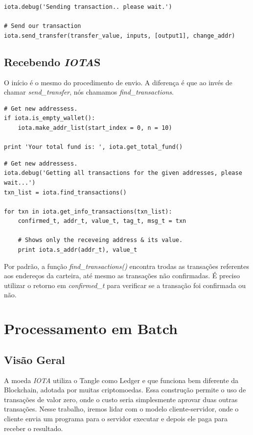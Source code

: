 \documentclass[a4paper]{article}
\begin{document}
\begin{lstlisting}
iota.debug('Sending transaction.. please wait.')

# Send our transaction
iota.send_transfer(transfer_value, inputs, [output1], change_addr)
\end{lstlisting}

\subsection{Recebendo \textit{IOTA}S}

O início é o mesmo do procedimento de envio. A diferença é que ao invés de chamar \textit{send\_transfer}, nós chamamos \textit{find\_transactions}.

\begin{lstlisting}
# Get new addressess.
if iota.is_empty_wallet():
    iota.make_addr_list(start_index = 0, n = 10)

print 'Your total fund is: ', iota.get_total_fund()
\end{lstlisting}


\begin{lstlisting}
# Get new addressess.
iota.debug('Getting all transactions for the given addresses, please wait...')
txn_list = iota.find_transactions()

for txn in iota.get_info_transactions(txn_list):
    confirmed_t, addr_t, value_t, tag_t, msg_t = txn

    # Shows only the receveing address & its value.
    print iota.s_addr(addr_t), value_t
\end{lstlisting}

Por padrão, a função \textit{find\_transactions()} encontra trodas as transações referentes aos endereços da carteira, até mesmo
as transações não confirmadas. É preciso utilizar o retorno em \textit{confirmed\_t} para verificar se a transação foi confirmada
ou não.

\section{Processamento em Batch}\label{sec:Metodology}

\subsection{Visão Geral}

A moeda \textit{IOTA} utiliza o Tangle como Ledger e que funciona bem diferente da Blockchain, adotada por muitas criptomoedas. Essa construção
permite o uso de transações de valor zero, onde o custo seria simplesmente aprovar duas outras transações. Nesse trabalho, iremos
lidar com o modelo cliente-servidor, onde o cliente envia um programa para o servidor executar e depois ele paga para receber
o resultado.
\end{document}
